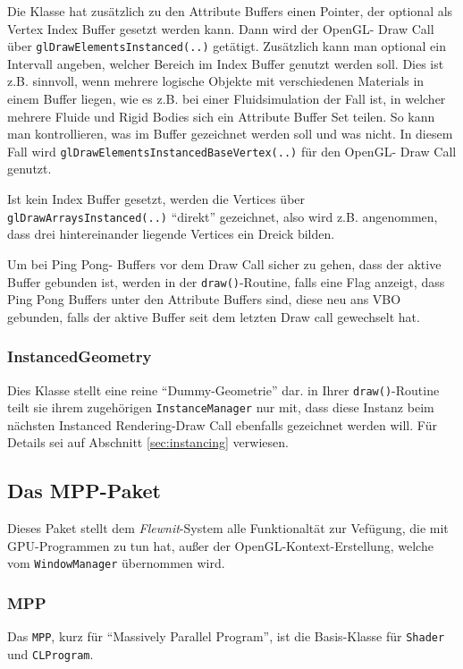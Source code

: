 	Die Klasse hat zusätzlich zu den Attribute Buffers einen Pointer, der optional als Vertex Index Buffer
	gesetzt werden kann. Dann wird der OpenGL- Draw Call über \lstinline|glDrawElementsInstanced(..)|
	getätigt.
	Zusätzlich kann man optional ein Intervall angeben, welcher Bereich 
	im Index Buffer genutzt werden soll.
	Dies ist z.B. sinnvoll, wenn mehrere logische Objekte mit verschiedenen Materials in einem Buffer
	liegen, wie es z.B. bei einer Fluidsimulation der Fall ist, in welcher mehrere Fluide und Rigid Bodies sich
	ein Attribute Buffer Set teilen. So kann man kontrollieren, was im Buffer gezeichnet werden soll und was nicht.
	In diesem Fall wird \lstinline|glDrawElementsInstancedBaseVertex(..)| für den OpenGL- Draw Call genutzt.
	
	Ist kein Index Buffer gesetzt, werden die Vertices über \lstinline|glDrawArraysInstanced(..)|	
	 "`direkt"' gezeichnet, also wird z.B. angenommen, dass drei hintereinander liegende Vertices ein Dreick bilden. 
	
	Um bei Ping Pong- Buffers vor dem Draw Call sicher zu gehen, dass der aktive Buffer gebunden ist,
	werden in der \lstinline|draw()|-Routine, falls eine Flag anzeigt, dass Ping Pong Buffers unter den 
	Attribute Buffers sind, diese neu ans VBO gebunden, falls der aktive Buffer seit dem letzten Draw call gewechselt hat.
	
	
	\subsubsection{InstancedGeometry}
	Dies Klasse stellt eine reine "`Dummy-Geometrie"' dar. in Ihrer \lstinline|draw()|-Routine teilt sie ihrem
	zugehörigen \lstinline|InstanceManager| nur mit, dass diese Instanz beim nächsten Instanced Rendering-Draw Call
	ebenfalls gezeichnet werden will. Für Details sei auf Abschnitt \ref{sec:instancing} verwiesen.
	
	

\subsection{Das MPP-Paket}

Dieses Paket stellt dem \emph{Flewnit}-System alle Funktionaltät zur Vefügung, die mit
GPU-Programmen zu tun hat, außer der OpenGL-Kontext-Erstellung,
welche vom \lstinline|WindowManager| übernommen wird.


	\subsubsection{MPP}
	Das \lstinline|MPP|, kurz für "`Massively Parallel Program"', ist die Basis-Klasse für
	\lstinline|Shader| und \lstinline|CLProgram|.
	
